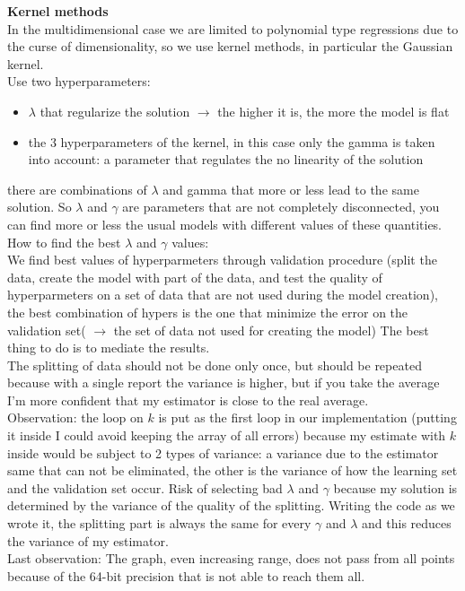 \textbf {Kernel methods}\\

In the multidimensional case we are limited to polynomial type regressions due to the curse of dimensionality, so we use kernel methods, in particular the Gaussian kernel.\\
Use two hyperparameters:
\begin{itemize}
	\item $\lambda$ that regularize the solution $\rightarrow$ the higher it is, the more the model is flat
	\item the 3 hyperparameters of the kernel, in this case only the gamma is taken into account: a parameter that regulates the no linearity of the solution
\end{itemize}
there are combinations of $\lambda$ and gamma that more or less lead to the same solution. So $\lambda$ and $\gamma$ are parameters that are not completely disconnected, you can find more or less the usual models with different values of these quantities.\\
How to find the best $\lambda$ and $\gamma$ values:\\
We find best values of hyperparmeters through validation procedure (split the data, create the model with part of the data, and test the quality of hyperparmeters on a set of data that are not used during the model creation), the best combination of hypers is the one that minimize the error on the validation set( $\rightarrow$ the set of data not used for creating the model)
The best thing to do is to mediate the results.\\
The splitting of data should not be done only once, but should be repeated because with a single report the variance is higher, but if you take the average I'm more confident that my estimator is close to the real average.\\
Observation: the loop on $k$ is put as the first loop in our implementation (putting it inside I could avoid keeping the array of all errors) because my estimate with $k$ inside would be subject to 2 types of variance: a variance due to the estimator same that can not be eliminated, the other is the variance of how the learning set and the validation set occur. Risk of selecting bad $\lambda$ and $\gamma$ because my solution is determined by the variance of the quality of the splitting. Writing the code as we wrote it, the splitting part is always the same for every $\gamma$ and $\lambda$ and this reduces the variance of my estimator.\\
Last observation: The graph, even increasing range, does not pass from all points because of the 64-bit precision that is not able to reach them all.



